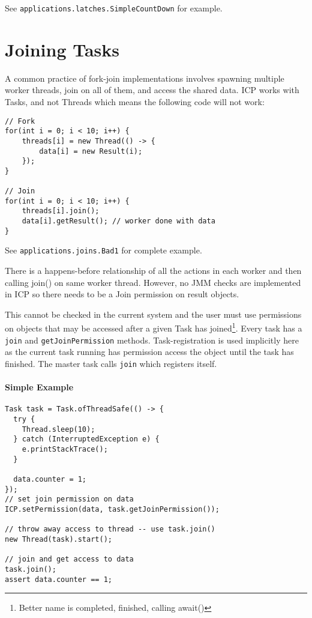 \documentclass[9pt, twoside, a4paper]{article}
\begin{document}
    See \lstinline{applications.latches.SimpleCountDown} for example.

    

    \section{Joining Tasks}
    A common practice of fork-join implementations involves spawning multiple worker threads, join on all of them,
    and access the shared data. ICP works with Tasks, and not Threads which means the following code will not work:

    \begin{lstlisting}
// Fork
for(int i = 0; i < 10; i++) {
    threads[i] = new Thread(() -> {
        data[i] = new Result(i);
    });
}

// Join
for(int i = 0; i < 10; i++) {
    threads[i].join();
    data[i].getResult(); // worker done with data
}
    \end{lstlisting}
    See \lstinline{applications.joins.Bad1} for complete example.

    There is a happens-before relationship of all the actions in each worker and then calling join() on same
    worker thread. However, no JMM checks are implemented in ICP so there needs to be a Join permission on result
    objects.

    This cannot be checked in the current system and the user must use permissions on objects that may be accessed
    after a given Task has joined\footnote{Better name is completed, finished, calling await()}. Every task has a
    \lstinline{join} and \lstinline{getJoinPermission} methods. Task-registration is used implicitly here as the
    current task running has permission access the object until the task has finished. The master task calls
    \lstinline{join} which registers itself.

    \paragraph*{Simple Example}
    \begin{lstlisting}[caption=Example of Task.join()]
Task task = Task.ofThreadSafe(() -> {
  try {
    Thread.sleep(10);
  } catch (InterruptedException e) {
    e.printStackTrace();
  }

  data.counter = 1;
});
// set join permission on data
ICP.setPermission(data, task.getJoinPermission());

// throw away access to thread -- use task.join()
new Thread(task).start();

// join and get access to data
task.join();
assert data.counter == 1;
    \end{lstlisting}
\end{document}
